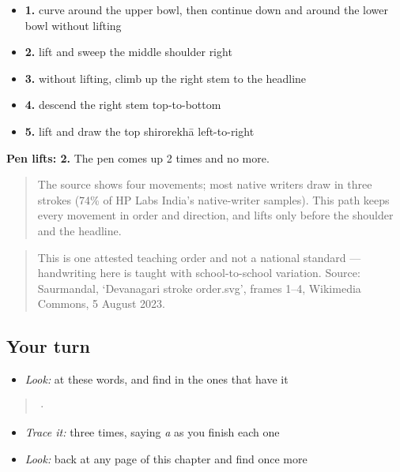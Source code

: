 \begin{itemize}
\raggedright
  \item \textbf{1.} curve around the upper bowl, then continue down and around the lower bowl without lifting
  \item \textbf{2.} lift and sweep the middle shoulder right
  \item \textbf{3.} without lifting, climb up the right stem to the headline
  \item \textbf{4.} descend the right stem top-to-bottom
  \item \textbf{5.} lift and draw the top shirorekhā left-to-right
\end{itemize}

\textbf{Pen lifts: 2.} The pen comes up 2 times and no more.

\begin{quote}
The source shows four movements; most native writers draw  in three strokes (74\% of HP Labs India's native-writer samples). This path keeps every movement in order and direction, and lifts only before the shoulder and the headline.
\end{quote}

\begin{quote}
This is one attested teaching order and not a national standard — handwriting here is taught with school-to-school variation. Source: Saurmandal, ‘Devanagari  stroke order.svg’, frames 1–4, Wikimedia Commons, 5 August 2023.
\end{quote}

\subsection*{Your turn}
\begin{itemize}
\raggedright
  \item \emph{Look:} at these words, and find  in the ones that have it
\end{itemize}

\begin{quote}
  ·  
\end{quote}

\begin{itemize}
\raggedright
  \item \emph{Trace it:}  three times, saying \emph{a} as you finish each one
  \item \emph{Look:} back at any page of this chapter and find  once more
\end{itemize}

